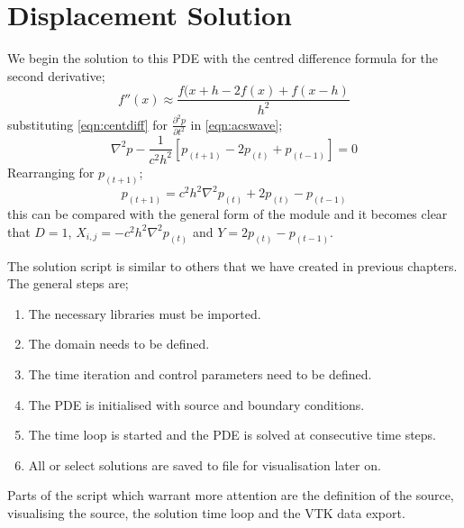 \section{Displacement Solution}

We begin the solution to this PDE with the centred difference formula for the
second derivative;
\begin{equation}
 f''(x) \approx \frac{f(x+h - 2f(x) + f(x-h)}{h^2}
\label{eqn:centdiff}
\end{equation}
substituting \autoref{eqn:centdiff} for $\frac{\partial ^2 p }{\partial t ^2}$
in \autoref{eqn:acswave};
\begin{equation}
 \nabla ^2 p - \frac{1}{c^2h^2} \left[p_{(t+1)} - 2p_{(t)} +
p_{(t-1)} \right]
= 0
\label{eqn:waveu}
\end{equation}
Rearranging for $p_{(t+1)}$;
\begin{equation}
 p_{(t+1)} = c^2 h^2 \nabla ^2 p_{(t)} +2p_{(t)} -
p_{(t-1)}
\end{equation}
this can be compared with the general form of the \modLPDE module and it
becomes clear that $D=1$, $X_{i,j}=-c^2 h^2 \nabla ^2 p_{(t)}$ and
$Y=2p_{(t)} - p_{(t-1)}$.

The solution script is similar to others that we have created in previous
chapters. The general steps are;
\begin{enumerate}
 \item The necessary libraries must be imported.
 \item The domain needs to be defined.
 \item The time iteration and control parameters need to be defined.
 \item The PDE is initialised with source and boundary conditions.
 \item The time loop is started and the PDE is solved at consecutive time steps.
 \item All or select solutions are saved to file for visualisation later on.
\end{enumerate}

Parts of the script which warrant more attention are the definition of the
source, visualising the source, the solution time loop and the VTK data export.

